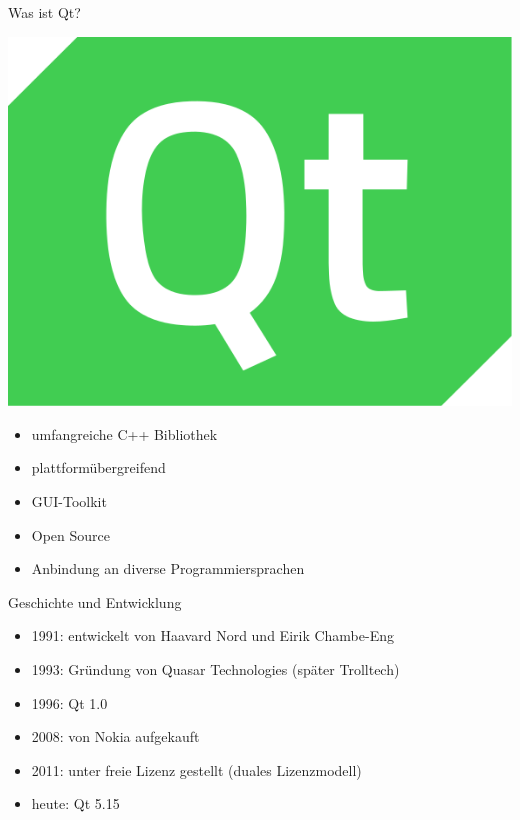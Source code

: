\documentclass[aspectratio=169]{beamer}
\begin{document}

\begin{frame}[fragile]{Was ist Qt?}
\begin{flushright}
\includegraphics[scale=0.1]{logo}
\end{flushright}
\begin{itemize}
\item umfangreiche C++ Bibliothek
\item plattformübergreifend
\item GUI-Toolkit
\item Open Source
\item Anbindung an diverse Programmiersprachen
\end{itemize}
\end{frame}


\begin{frame}{Geschichte und Entwicklung}
\begin{itemize}
\item 1991: entwickelt von Haavard Nord und Eirik Chambe-Eng
\item 1993: Gründung von Quasar Technologies (später Trolltech)
\item 1996: Qt 1.0
\item 2008: von Nokia aufgekauft
\item 2011: unter freie Lizenz gestellt (duales Lizenzmodell)
\item heute: Qt 5.15
\end{itemize}
\end{frame}
\end{document}
